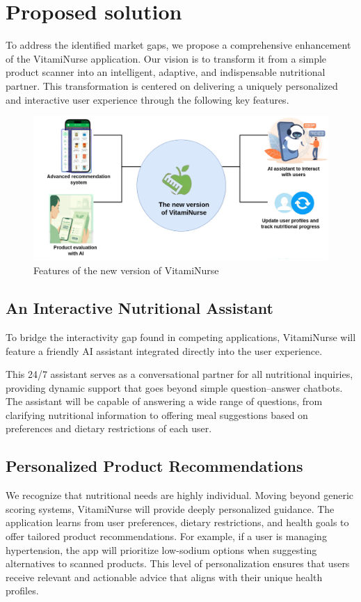  
\section{Proposed solution}
  
To address the identified market gaps, we propose a comprehensive
enhancement of the VitamiNurse application. Our vision is to transform it from a simple product scanner into an intelligent, adaptive, and
indispensable nutritional partner. This transformation is centered on delivering a uniquely personalized and interactive user experience through
the following key features.

\begin{figure}[H]
\centering
\includegraphics[scale=0.45]{images/new_version_VN.png}
\caption{Features of the new version of VitamiNurse}
\label{fig:VN_new_features}
\end{figure}

\subsection{An Interactive Nutritional Assistant}

To bridge the interactivity gap found in competing applications, VitamiNurse will feature a friendly AI assistant integrated directly into the
user experience.
\par This 24/7 assistant serves as a conversational partner
for all nutritional inquiries, providing dynamic support that goes beyond
simple question–answer chatbots.
The assistant will be capable of answering a wide range of questions,
from clarifying nutritional information to offering meal suggestions based
on preferences and dietary restrictions of each user.

\subsection{Personalized Product Recommendations}
We recognize that nutritional needs are highly individual. Moving beyond
generic scoring systems, VitamiNurse will provide deeply personalized
guidance. The application learns from user preferences, dietary restrictions, and health goals to offer tailored product recommendations.
For example, if a user is managing hypertension, the app will prioritize low-sodium options when suggesting alternatives to scanned products. 
This level of personalization ensures that users receive relevant and actionable advice that aligns with their unique health profiles.

